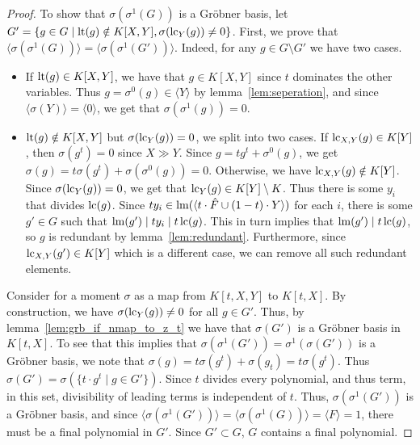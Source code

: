 \begin{proof}
  To show that $\sigma(\sigma^{1}(G))$ is a Gröbner basis, let $G' = \{g \in G \mid \operatorname{lt}(g) \notin K[X, Y], \sigma(\operatorname{lc}_{Y}(g)) \neq 0\}$. First, we prove that $\langle \sigma(\sigma^{1}(G)) \rangle = \langle \sigma(\sigma^{1}(G')) \rangle$. Indeed, for any $g \in G \setminus G'$ we have two cases.
  \begin{itemize}
    \item If $\operatorname{lt}(g) \in K[X, Y]$, we have that $g \in K[X, Y]$ since $t$ dominates the other variables. Thus $g = \sigma^{0}(g) \in \langle Y \rangle$ by lemma~\ref{lem:seperation}, and since $\langle \sigma(Y) \rangle = \langle 0 \rangle$, we get that $\sigma(\sigma^{1}(g)) = 0$.
    \item $\operatorname{lt}(g) \notin K[X, Y]$ but $\sigma(\operatorname{lc}_{Y}(g)) = 0$, we split into two cases. If $\operatorname{lc}_{X, Y}(g) \in K[Y]$, then $\sigma(g^{t}) = 0$ since $X \gg Y$. Since $g = tg^{t} + \sigma^{0}(g)$, we get $\sigma(g) = t\sigma(g^{t}) + \sigma(\sigma^{0}(g)) = 0$. Otherwise, we have $\operatorname{lc}_{X, Y}(g) \notin K[Y]$. Since $\sigma(\operatorname{lc}_{Y}(g)) = 0$, we get that $\operatorname{lc}_{Y}(g) \in K[Y] \setminus K$. Thus there is some $y_{i}$ that divides $\operatorname{lc}(g)$. Since $ty_{i} \in \operatorname{lm}(\langle t\cdot \hat F \cup (1-t)\cdot Y \rangle)$ for each $i$, there is some $g' \in G$ such that $\operatorname{lm}(g') \mid ty_{i} \mid t\operatorname{lc}(g)$. This in turn implies that $\operatorname{lm}(g') \mid t\operatorname{lc}(g)$, so $g$ is redundant by lemma~\ref{lem:redundant}. Furthermore, since $\operatorname{lc}_{X, Y}(g') \in K[Y]$ which is a different case, we can remove all such redundant elements.
  \end{itemize}

  Consider for a moment $\sigma$ as a map from $K[t, X, Y]$ to $K[t, X]$. By construction, we have $\sigma(\operatorname{lc}_{Y}(g)) \neq 0$ for all $g \in G'$. Thus, by lemma~\ref{lem:grb_if_nmap_to_z_t} we have that $\sigma(G')$ is a Gröbner basis in $K[t, X]$. To see that this implies that $\sigma(\sigma^{1}(G')) = \sigma^{1}(\sigma(G'))$ is a Gröbner basis, we note that $\sigma(g) = t\sigma(g^{t}) + \sigma(g_{t}) = t\sigma(g^{t})$. Thus $\sigma(G') = \sigma(\{t \cdot g^{t} \mid g \in G'\})$. Since $t$ divides every polynomial, and thus term, in this set, divisibility of leading terms is independent of $t$. Thus, $\sigma(\sigma^{1}(G'))$ is a Gröbner basis, and since $\langle \sigma(\sigma^{1}(G')) \rangle = \langle \sigma(\sigma^{1}(G)) \rangle = \langle F \rangle = 1$, there must be a final polynomial in $G'$. Since $G' \subset G$, $G$ contains a final polynomial.
\end{proof}

















